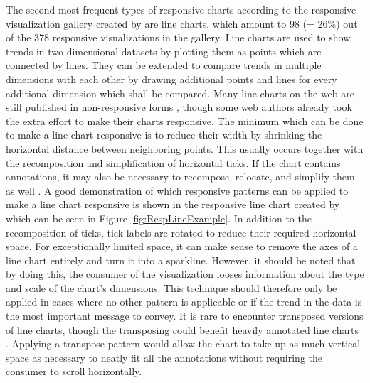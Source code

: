 The second most frequent types of responsive charts according to the responsive visualization gallery created by \cite{DesignPatternsTradeOffsRespVis} are line charts, which amount to 98 (= 26\%) out of the 378 responsive visualizations in the gallery.
Line charts are used to show trends in two-dimensional datasets by plotting them as points which are connected by lines.
They can be extended to compare trends in multiple dimensions with each other by drawing additional points and lines for every additional dimension which shall be compared.
Many line charts on the web are still published in non-responsive forms \parencite{HLine,HLine2}, though some web authors already took the extra effort to make their charts responsive.
The minimum which can be done to make a line chart responsive is to reduce their width \parencite{RespRadialScatterHLine} by shrinking the horizontal distance between neighboring points.
This usually occurs together with the recomposition and simplification of horizontal ticks.
If the chart contains annotations, it may also be necessary to recompose, relocate, and simplify them as well \parencite{RespHLines,RespHLine,RespHBarHLine,RespHLineHStackedBar}.
A good demonstration of which responsive patterns can be applied to make a line chart responsive is shown in the responsive line chart created by \cite{RespVis} which can be seen in Figure \ref{fig:RespLineExample}.
In addition to the recomposition of ticks, tick labels are rotated to reduce their required horizontal space.
For exceptionally limited space, it can make sense to remove the axes of a line chart entirely and turn it into a sparkline.
However, it should be noted that by doing this, the consumer of the visualization looses information about the type and scale of the chart's dimensions.
This technique should therefore only be applied in cases where no other pattern is applicable or if the trend in the data is the most important message to convey.
It is rare to encounter transposed versions of line charts, though the transposing could benefit heavily annotated line charts \parencite{VLine}.
Applying a transpose pattern would allow the chart to take up as much vertical space as necessary to neatly fit all the annotations without requiring the consumer to scroll horizontally.

